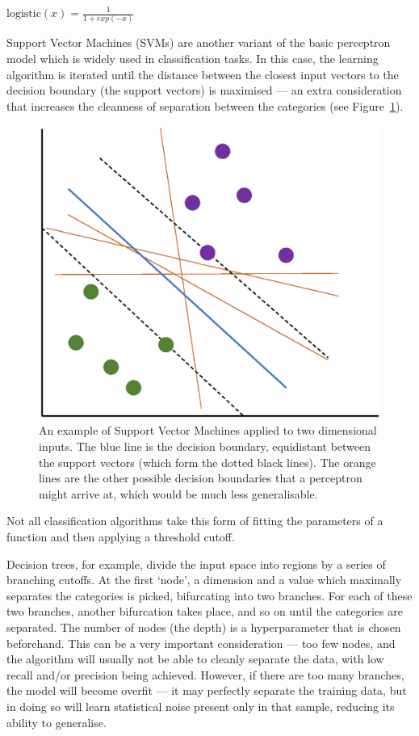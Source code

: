 $\text{logistic}(x)=\frac{1}{1+exp(-x)}$

Support Vector Machines (SVMs) are another variant of the basic perceptron model which is widely used in classification tasks. In this case, the learning algorithm is iterated until the distance between the closest input vectors to the decision boundary (the support vectors) is maximised --- an extra consideration that increases the cleanness of separation between the categories (see Figure~\ref{fig:SVM}).

\begin{figure}
\centering
\includegraphics[width=1.0\textwidth]{Figures/SVM.eps}
\caption[Support Vector Machines]{\label{fig:SVM} An example of Support Vector Machines applied to two dimensional inputs. The blue line is the decision boundary, equidistant between the support vectors (which form the dotted black lines). The orange lines are the other possible decision boundaries that a perceptron might arrive at, which would be much less generalisable.}
\end{figure}

Not all classification algorithms take this form of fitting the parameters of a function and then applying a threshold cutoff.

Decision trees, for example, divide the input space into regions by a series of branching cutoffs. At the first `node', a dimension and a value which maximally separates the categories is picked, bifurcating into two branches. For each of these two branches, another bifurcation takes place, and so on until the categories are separated. The number of nodes (the depth) is a hyperparameter that is chosen beforehand. This can be a very important consideration --- too few nodes, and the algorithm will usually not be able to cleanly separate the data, with low recall and/or precision being achieved. However, if there are too many branches, the model will become overfit --- it may perfectly separate the training data, but in doing so will learn statistical noise present only in that sample, reducing its ability to generalise.

